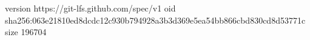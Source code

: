 version https://git-lfs.github.com/spec/v1
oid sha256:063e21810ed8dcdc12c930b794928a3b3d369e5ea54bb866cbd830cd8d53771c
size 196704

